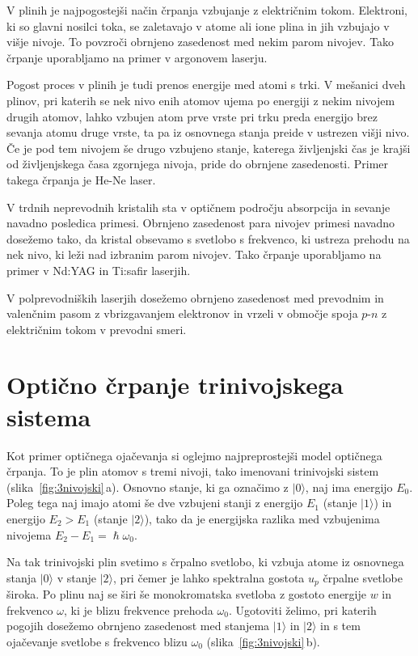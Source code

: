 V plinih je najpogostejši način črpanja vzbujanje z električnim tokom. Elektroni,
ki so glavni nosilci toka, se zaletavajo v atome ali ione plina in jih vzbujajo
v višje nivoje. To povzroči obrnjeno zasedenost med
nekim parom nivojev. Tako črpanje uporabljamo na primer v argonovem laserju. 

Pogost proces v plinih je tudi prenos energije med atomi s trki. V
mešanici dveh plinov, pri katerih se nek nivo enih atomov ujema po energiji z
nekim nivojem drugih atomov, lahko vzbujen atom prve vrste pri trku preda 
energijo brez sevanja atomu druge vrste, ta pa iz osnovnega stanja preide v 
ustrezen višji nivo. Če je pod tem nivojem še drugo vzbujeno stanje, katerega
življenjski čas je krajši od življenjskega časa zgornjega nivoja, pride
do obrnjene zasedenosti. Primer takega črpanja je He-Ne laser.

V trdnih neprevodnih kristalih sta v optičnem področju absorpcija
in sevanje navadno posledica primesi.
Obrnjeno zasedenost para nivojev primesi navadno dosežemo tako, da
kristal obsevamo s svetlobo s frekvenco, ki ustreza prehodu na nek
nivo, ki leži nad izbranim parom nivojev. Tako črpanje uporabljamo na primer v Nd:YAG in Ti:safir 
laserjih.  

V polprevodniških laserjih dosežemo obrnjeno zasedenost med 
prevodnim in valenčnim pasom z vbrizgavanjem elektronov in vrzeli v območje spoja $p$-$n$ 
z električnim tokom v prevodni smeri. 

\section{Optično črpanje trinivojskega sistema}
Kot primer optičnega ojačevanja si oglejmo najpreprostejši model optičnega črpanja.
To je plin atomov s tremi nivoji, tako imenovani trinivojski sistem (slika~\ref{fig:3nivojski}\,a).
Osnovno stanje, ki 
ga označimo z $|0\rangle$,  naj ima energijo $E_0$. Poleg tega naj imajo atomi še 
dve vzbujeni stanji z energijo $E_1$ (stanje $|1\rangle$) in energijo $E_2>E_1$
(stanje $|2\rangle$), tako da je energijska razlika med vzbujenima 
nivojema $E_2-E_1 = \hslash \omega_0$.

Na tak trinivojski plin svetimo s črpalno svetlobo, ki vzbuja atome iz osnovnega stanja 
$|0\rangle$ v stanje $|2\rangle$, pri čemer je lahko spektralna gostota $u_{p}$ črpalne 
svetlobe široka. Po plinu naj se širi še monokromatska svetloba z gostoto 
energije $w$ in frekvenco $\omega$, ki je blizu frekvence prehoda $\omega_{0}$. 
Ugotoviti želimo, pri katerih pogojih  dosežemo obrnjeno zasedenost med 
stanjema $|1\rangle$ in $|2\rangle$ in s tem ojačevanje svetlobe s frekvenco blizu
$\omega_{0}$ (slika~\ref{fig:3nivojski}\,b).

